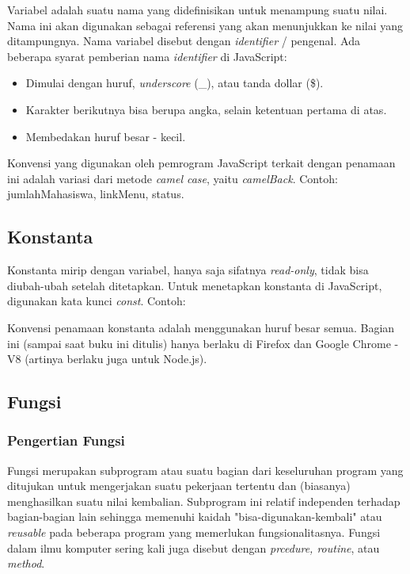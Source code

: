 Variabel adalah suatu nama yang didefinisikan untuk menampung suatu nilai. Nama ini akan digunakan sebagai referensi yang akan menunjukkan ke nilai yang ditampungnya. Nama variabel disebut dengan \textit{identifier} / pengenal. Ada beberapa syarat pemberian nama \textit{identifier} di JavaScript: 
\begin{itemize}
  \item Dimulai dengan huruf, \textit{underscore} (\_), atau tanda dollar (\$).
  \item Karakter berikutnya bisa berupa angka, selain ketentuan pertama di atas.
  \item Membedakan huruf besar - kecil.
\end{itemize}
Konvensi yang digunakan oleh pemrogram JavaScript terkait dengan penamaan ini adalah variasi dari metode \textit{camel case}, yaitu \textit{camelBack}. Contoh: jumlahMahasiswa, linkMenu, status.

\subsection{Konstanta}

Konstanta mirip dengan variabel, hanya saja sifatnya \textit{read-only}, tidak bisa diubah-ubah setelah ditetapkan. Untuk menetapkan konstanta di JavaScript, digunakan kata kunci \textit{const}. Contoh: 

\lstset{language=JavaScript,caption=Contoh konstanta dalam JavaScript}


Konvensi penamaan konstanta adalah menggunakan huruf besar semua. Bagian ini (sampai saat buku ini ditulis) hanya berlaku di Firefox dan Google Chrome - V8 (artinya berlaku juga untuk Node.js).

\subsection{Fungsi}

\subsubsection{Pengertian Fungsi}

Fungsi merupakan subprogram atau suatu bagian dari keseluruhan program yang ditujukan untuk mengerjakan suatu pekerjaan tertentu dan (biasanya) menghasilkan suatu nilai kembalian. Subprogram ini relatif independen terhadap bagian-bagian lain sehingga memenuhi kaidah "bisa-digunakan-kembali" atau \textit{reusable} pada beberapa program yang memerlukan fungsionalitasnya. Fungsi dalam ilmu komputer sering kali juga disebut dengan \textit{prcedure, routine}, atau \textit{method}.

